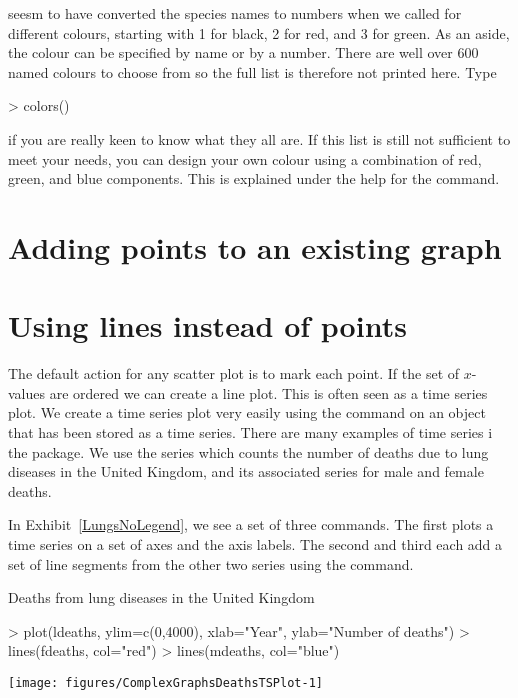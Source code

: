 \R{} seesm to have converted the species names to numbers when we called for different colours, starting with 1 for black, 2 for red, and 3 for green. As an aside, the colour can be specified by name or by a number. There are well over 600 named colours to choose from so the full list is therefore not printed here. Type 

\begin{Schunk}
\begin{Sinput}
> colors() 
\end{Sinput}
\end{Schunk}

if you are really keen to know what they all are. If this list is still not sufficient to meet your needs, you can design your own colour using a combination of red, green, and blue components. This is explained under the help for the  command. 
 
\section{Adding points to an existing graph} 
 
\section{Using lines instead of points} \label{LinesInsteadOfPoints}  
 
The default action for any scatter plot is to mark each point. If the set of $x$-values are ordered we can create a line plot. This is often seen as a time series plot. We create a time series plot very easily using the  command on an object that has been stored as a time series. There are many examples of time series i the  package. We use the  series which counts the number of deaths due to lung diseases in the United Kingdom, and its associated series for male and female deaths. 
 
In Exhibit~\ref{LungsNoLegend}, we see a set of three commands. The first plots a time series on a set of axes and the axis labels. The second and third each add a set of line segments from the other two series using the  command. 
 
\begin{exhibit} 
\begin{center} 
\caption{Deaths from lung diseases in the United Kingdom} 
\label{LungsNoLegend} 

\begin{Schunk}
\begin{Sinput}
> plot(ldeaths, ylim=c(0,4000), xlab="Year", ylab="Number of deaths") 
> lines(fdeaths, col="red") 
> lines(mdeaths, col="blue") 
\end{Sinput}

\texttt{[image: figures/ComplexGraphsDeathsTSPlot-1]} \end{Schunk}

\end{center} 
\end{exhibit} 
 
